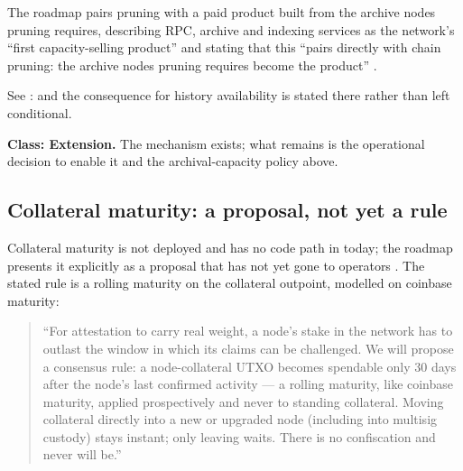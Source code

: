 The roadmap pairs pruning with a paid product built from the archive nodes pruning requires, describing
RPC, archive and indexing services as the network's ``first capacity-selling product'' and stating that
this ``pairs directly with chain pruning: the archive nodes pruning requires become the product''
.  

See :  and the consequence for history availability is stated there rather than
left conditional. \srcinferred

\textbf{Class: Extension.} The mechanism exists; what remains is the operational decision to enable it
and the archival-capacity policy above.

\subsection{Collateral maturity: a proposal, not yet a rule}

Collateral maturity is not deployed and has no code path in \fluxd today; the roadmap presents it
explicitly as a proposal that has not yet gone to operators 
\planned. The stated rule is a rolling maturity on the collateral outpoint, modelled on coinbase
maturity:

\begin{quote}
``For attestation to carry real weight, a node's stake in the network has to outlast the window in
which its claims can be challenged. We will propose a consensus rule: a node-collateral UTXO becomes
spendable only 30 days after the node's last confirmed activity — a rolling maturity, like coinbase
maturity, applied prospectively and never to standing collateral. Moving collateral directly into a new
or upgraded node (including into multisig custody) stays instant; only leaving waits. There is no
confiscation and never will be.'' 
\end{quote}

